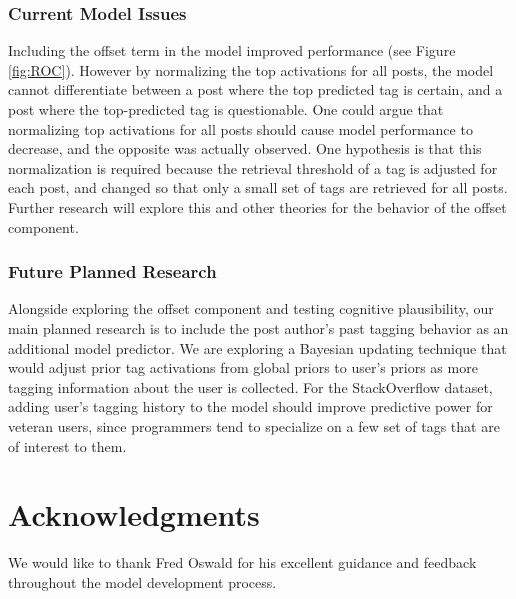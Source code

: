 \documentclass[10pt,letterpaper]{article}
\begin{document}
\subsubsection{Current Model Issues}

Including the offset term in the model improved performance (see Figure \ref{fig:ROC}).
However by normalizing the top activations for all posts, the model cannot differentiate between a post where the top predicted tag is certain, and a post where the top-predicted tag is questionable.
One could argue that normalizing top activations for all posts should cause model performance to decrease, and the opposite was actually observed.
One hypothesis is that this normalization is required because the retrieval threshold of a tag is adjusted for each post, and changed so that only a small set of tags are retrieved for all posts.
Further research will explore this and other theories for the behavior of the offset component.

\subsubsection{Future Planned Research}

Alongside exploring the offset component and testing cognitive plausibility, our main planned research is to include the post author's past tagging behavior as an additional model predictor.
We are exploring a Bayesian updating technique that would adjust prior tag activations from global priors to user's priors as more tagging information about the user is collected.
For the StackOverflow dataset, adding user's tagging history to the model should improve predictive power for veteran users,
since programmers tend to specialize on a few set of tags that are of interest to them.

\section{Acknowledgments}

We would like to thank Fred Oswald for his excellent guidance and feedback throughout the model development process.


\setlength{\bibleftmargin}{.125in}
\setlength{\bibindent}{-\bibleftmargin}

\end{document}
